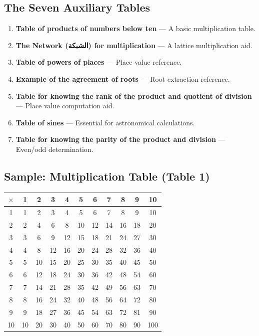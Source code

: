 \documentclass[11pt,a4paper]{article}
\newcommand{\ar}[1]{\arabicfont\beginR #1\endR}
\begin{document}
\subsection{The Seven Auxiliary Tables}

\begin{enumerate}[label=\textbf{Table \arabic*:}]
  \item \textbf{Table of products of numbers below ten} --- A basic
  multiplication table.
  \item \textbf{The Network (\ar{الشبكة}) for multiplication} --- A
  lattice multiplication aid.
  \item \textbf{Table of powers of places} --- Place value reference.
  \item \textbf{Example of the agreement of roots} --- Root extraction
  reference.
  \item \textbf{Table for knowing the rank of the product and quotient
  of division} --- Place value computation aid.
  \item \textbf{Table of sines} --- Essential for astronomical
  calculations.
  \item \textbf{Table for knowing the parity of the product and
  division} --- Even/odd determination.
\end{enumerate}

\subsection{Sample: Multiplication Table (Table 1)}

\begin{center}
\begin{tabular}{|c|cccccccccc|}
\hline
$\times$ & 1 & 2 & 3 & 4 & 5 & 6 & 7 & 8 & 9 & 10 \\
\hline
1 & 1 & 2 & 3 & 4 & 5 & 6 & 7 & 8 & 9 & 10 \\
2 & 2 & 4 & 6 & 8 & 10 & 12 & 14 & 16 & 18 & 20 \\
3 & 3 & 6 & 9 & 12 & 15 & 18 & 21 & 24 & 27 & 30 \\
4 & 4 & 8 & 12 & 16 & 20 & 24 & 28 & 32 & 36 & 40 \\
5 & 5 & 10 & 15 & 20 & 25 & 30 & 35 & 40 & 45 & 50 \\
6 & 6 & 12 & 18 & 24 & 30 & 36 & 42 & 48 & 54 & 60 \\
7 & 7 & 14 & 21 & 28 & 35 & 42 & 49 & 56 & 63 & 70 \\
8 & 8 & 16 & 24 & 32 & 40 & 48 & 56 & 64 & 72 & 80 \\
9 & 9 & 18 & 27 & 36 & 45 & 54 & 63 & 72 & 81 & 90 \\
10 & 10 & 20 & 30 & 40 & 50 & 60 & 70 & 80 & 90 & 100 \\
\hline
\end{tabular}
\end{center}
\clearpage
\end{document}
